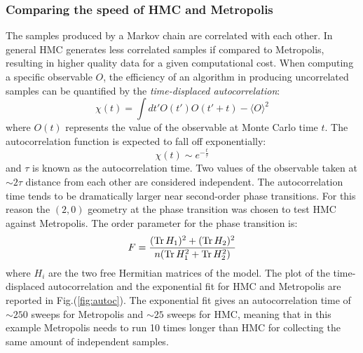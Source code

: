 \subsubsection{Comparing the speed of HMC and Metropolis}
The samples produced by a Markov chain are correlated with each other. In general HMC generates less correlated samples if compared to Metropolis, resulting in higher quality data for a given computational cost.\newline
When computing a specific observable $O$, the efficiency of an algorithm in producing uncorrelated samples can be quantified by the \textit{time-displaced autocorrelation}:
\begin{equation}
\chi(t) = \int dt' O(t')O(t'+t) - \langle O \rangle^2
\end{equation}
where $O(t)$ represents the value of the observable at Monte Carlo time $t$. The autocorrelation function is expected to fall off exponentially:
\begin{equation}
\chi(t) \sim e^{-\frac{t}{\tau}}
\end{equation}
and $\tau$ is known as the autocorrelation time. Two values of the observable taken at $\sim 2\tau$ distance from each other are considered independent.\newline
The autocorrelation time tends to be dramatically larger near second-order phase transitions. For this reason the $(2,0)$ geometry at the phase transition was chosen to test HMC against Metropolis. The order parameter for the phase transition is:
\begin{equation}
F = \frac{(\operatorname{Tr} H_1)^2 + (\operatorname{Tr} H_2)^2}{n( \operatorname{Tr} H_1^2 + \operatorname{Tr} H_2^2)}
\end{equation}
where $H_i$ are the two free Hermitian matrices of the model. The plot of the time-displaced autocorrelation and the exponential fit for HMC and Metropolis are reported in Fig.(\ref{fig:autoc}). The exponential fit gives an autocorrelation time of $\sim 250$ sweeps for Metropolis and $\sim 25$ sweeps for HMC, meaning that in this example Metropolis needs to run 10 times longer than HMC for collecting the same amount of independent samples.
